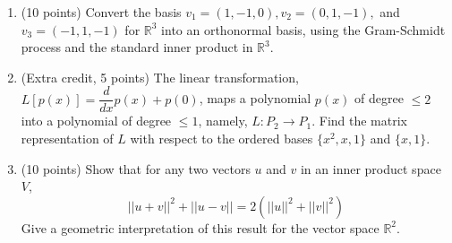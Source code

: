 \documentclass[fleqn]{article}
\begin{document}
\begin{enumerate}
    \item (10 points) Convert the basis $v_1=(1, -1, 0), v_2=(0, 1, -1),$ and $v_3=(-1, 1, -1)$ for $\mathbb{R}^3$ into
    an orthonormal basis, using the Gram-Schmidt process and the standard inner product in $\mathbb{R}^3$.

          

    \item (Extra credit, 5 points) The linear transformation, $L \left[p(x)\right]=\dfrac{d}{dx}p(x)+p(0)$, maps 
    a polynomial $p(x)$ of degree $\leq 2$  into a polynomial of degree $\leq 1$, namely, $L: P_2 \rightarrow P_1$.
    Find the matrix representation of $L$ with respect to the ordered bases $\{ x^2, x, 1\}$ and $\{ x, 1\}$.

          

    \item (10 points) Show that for any two vectors $u$ and $v$ in an inner product space $V$,
    $$||u+v||^2+||u-v||=2\left(||u||^2+||v||^2\right)$$
    Give a geometric interpretation of this result for the vector space $\mathbb{R}^2$.

          

  \end{enumerate}
\end{document}
